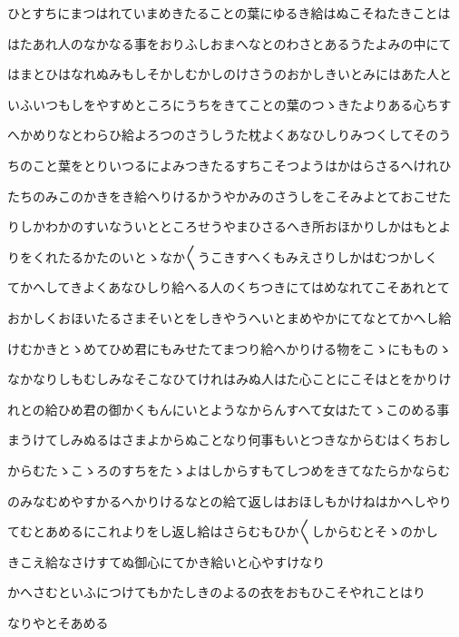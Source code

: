 \documentclass[a4paper,11pt,landscape]{ltjtarticle}
\begin{document}
\par\medskip
ひとすちにまつはれていまめきたることの葉にゆるき給はぬこそねたきことは
\par\medskip
はたあれ人のなかなる事をおりふしおまへなとのわさとあるうたよみの中にて
\par\medskip
はまとひはなれぬみもしそかしむかしのけさうのおかしきいとみにはあた人と
\par\medskip
いふいつもしをやすめところにうちをきてことの葉のつゝきたよりある心ちす
\par\medskip
へかめりなとわらひ給よろつのさうしうた枕よくあなひしりみつくしてそのう
\par\medskip
ちのこと葉をとりいつるによみつきたるすちこそつようはかはらさるへけれひ
\par\medskip
たちのみこのかきをき給へりけるかうやかみのさうしをこそみよとておこせた
\par\medskip
りしかわかのすいなういとところせうやまひさるへき所おほかりしかはもとよ
\par\medskip
りをくれたるかたのいとゝなか〱うこきすへくもみえさりしかはむつかしく
\par\medskip
てかへしてきよくあなひしり給へる人のくちつきにてはめなれてこそあれとて
\par\medskip
おかしくおほいたるさまそいとをしきやうへいとまめやかにてなとてかへし給
\par\medskip
けむかきとゝめてひめ君にもみせたてまつり給へかりける物をこゝにもものゝ
\par\medskip
なかなりしもむしみなそこなひてけれはみぬ人はた心ことにこそはとをかりけ
\par\medskip
れとの給ひめ君の御かくもんにいとようなからんすへて女はたてゝこのめる事
\par\medskip
まうけてしみぬるはさまよからぬことなり何事もいとつきなからむはくちおし
\par\medskip
からむたゝこゝろのすちをたゝよはしからすもてしつめをきてなたらかならむ
\par\medskip
のみなむめやすかるへかりけるなとの給て返しはおほしもかけねはかへしやり
\par\medskip
てむとあめるにこれよりをし返し給はさらむもひか〱しからむとそゝのかし
\par\medskip
きこえ給なさけすてぬ御心にてかき給いと心やすけなり
\par\medskip
かへさむといふにつけてもかたしきのよるの衣をおもひこそやれことはり
\par\medskip
なりやとそあめる
\par\medskip
\end{document}
